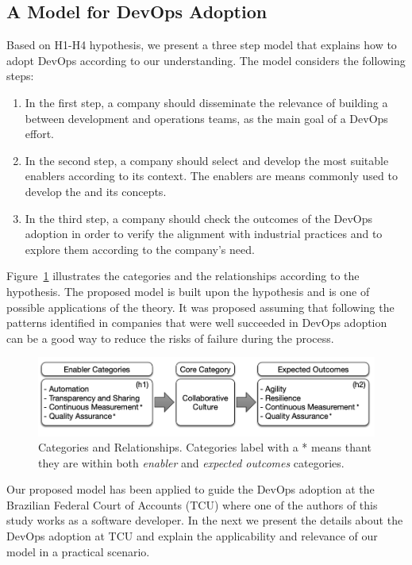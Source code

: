 \subsection{A Model for DevOps Adoption}\label{sec:case_study}

Based on H1-H4 hypothesis, we present a three step model that
explains how to adopt DevOps according to our understanding. The
model considers the following steps:

\begin{enumerate}
\item In the first step, a company should
  disseminate the relevance of building a \cc between
  development and operations teams, as the main
  goal of a DevOps effort.

\item In the second step, a company should select and develop
the most suitable enablers according to its context. The enablers
are means commonly used to develop the \cc and its concepts.

\item In the third step, a company should check the outcomes of the
DevOps adoption in order to verify the alignment with
industrial practices and to explore them according to the company's need.
\end{enumerate}

Figure~\ref{model} illustrates the categories and the
relationships according to the hypothesis. The proposed model is built upon
the hypothesis and is one of possible applications of the theory. It was proposed
assuming that following the patterns identified in companies that were
well succeeded in DevOps adoption can be a good way to reduce the risks of
failure during the process.

\begin{figure}[bht]
  \centering
  \includegraphics[width=.75\textwidth]{model.png}
  \caption{Categories and Relationships. Categories label with a * means
    thant they are within both \emph{enabler} and \emph{expected
    outcomes} categories.}
  \label{model}
\end{figure}


Our proposed model has been applied to guide the DevOps adoption at the
Brazilian Federal Court of Accounts (TCU) where one of the authors of this study
works as a software developer. In the next we present the details about the DevOps
adoption at TCU and explain the applicability and relevance of our model in a
practical scenario. 
